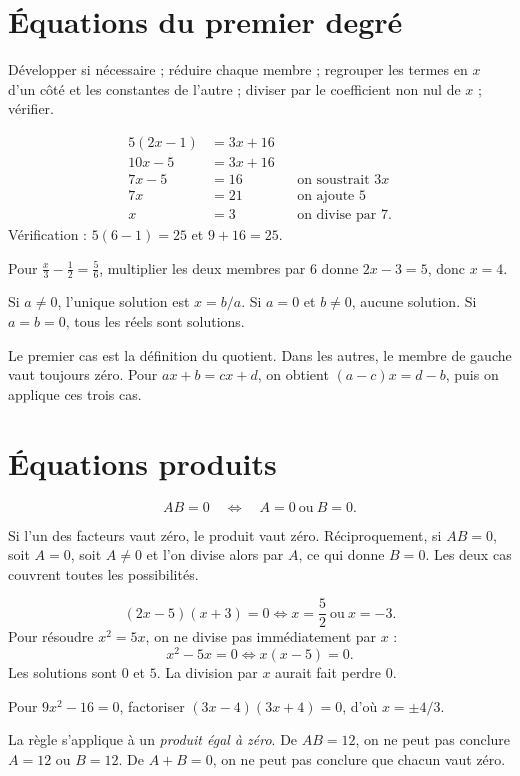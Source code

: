\documentclass[../cours_3e.tex]{subfiles}
\begin{document}
\section{Équations du premier degré}
\begin{methode}
Développer si nécessaire ; réduire chaque membre ; regrouper les termes en $x$ d'un côté et les constantes de l'autre ; diviser par le coefficient non nul de $x$ ; vérifier.
\end{methode}
\begin{exemple}
\[
\begin{aligned}
5(2x-1)&=3x+16\\
10x-5&=3x+16\\
7x-5&=16&&\text{on soustrait }3x\\
7x&=21&&\text{on ajoute }5\\
x&=3&&\text{on divise par }7.
\end{aligned}
\]
Vérification : $5(6-1)=25$ et $9+16=25$.
\end{exemple}
Pour $\frac{x}{3}-\frac12=\frac56$, multiplier les deux membres par $6$ donne $2x-3=5$, donc $x=4$.
\begin{propriete}[Tous les cas de $ax=b$]
Si $a\ne0$, l'unique solution est $x=b/a$. Si $a=0$ et $b\ne0$, aucune solution. Si $a=b=0$, tous les réels sont solutions.
\end{propriete}
\begin{justification}
Le premier cas est la définition du quotient. Dans les autres, le membre de gauche vaut toujours zéro. Pour $ax+b=cx+d$, on obtient $(a-c)x=d-b$, puis on applique ces trois cas.
\end{justification}
\section{Équations produits}
\begin{theoreme}
\[AB=0\quad\Longleftrightarrow\quad A=0\ \text{ou}\ B=0.\]
\end{theoreme}
\begin{demonstration}
Si l'un des facteurs vaut zéro, le produit vaut zéro. Réciproquement, si $AB=0$, soit $A=0$, soit $A\ne0$ et l'on divise alors par $A$, ce qui donne $B=0$. Les deux cas couvrent toutes les possibilités.
\end{demonstration}
\begin{exemple}
\[(2x-5)(x+3)=0\Longleftrightarrow x=\frac52\ \text{ou}\ x=-3.\]
Pour résoudre $x^2=5x$, on ne divise pas immédiatement par $x$ :
\[x^2-5x=0\Longleftrightarrow x(x-5)=0.\]
Les solutions sont $0$ et $5$. La division par $x$ aurait fait perdre $0$.
\end{exemple}
Pour $9x^2-16=0$, factoriser $(3x-4)(3x+4)=0$, d'où $x=\pm4/3$.
\begin{attention}
La règle s'applique à un \emph{produit égal à zéro}. De $AB=12$, on ne peut pas conclure $A=12$ ou $B=12$. De $A+B=0$, on ne peut pas conclure que chacun vaut zéro.
\end{attention}
\end{document}
